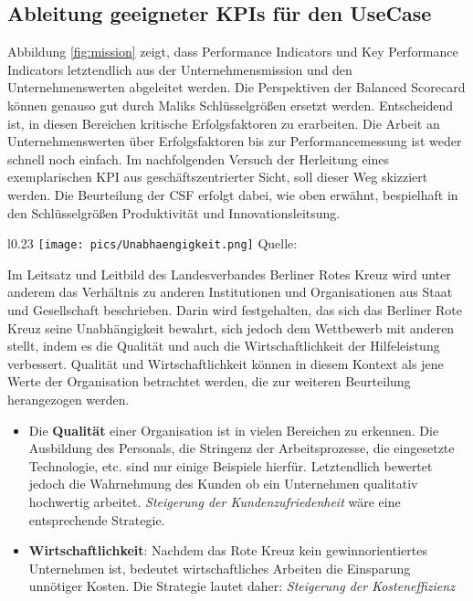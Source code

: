 \subsection{Ableitung geeigneter KPIs für den UseCase}
\label{drkkpi}
Abbildung \ref{fig:mission} zeigt, dass Performance Indicators und Key Performance Indicators letztendlich aus der Unternehmensmission und den Unternehmenswerten abgeleitet werden. Die Perspektiven der Balanced Scorecard können genauso gut durch Maliks Schlüsselgrößen ersetzt werden. Entscheidend ist, in diesen Bereichen kritische Erfolgsfaktoren zu erarbeiten. Die Arbeit an Unternehmenswerten über Erfolgsfaktoren bis zur Performancemessung ist weder schnell noch einfach. Im nachfolgenden Versuch der Herleitung eines exemplarischen KPI aus geschäftszentrierter Sicht, soll dieser Weg skizziert werden. Die Beurteilung der CSF erfolgt dabei, wie oben erwähnt, bespielhaft in den Schlüsselgrößen Produktivität und Innovationsleitsung.

\begin{wrapfigure}{l}{0.23\textwidth}
\label{values}
\centering
\texttt{[image: pics/Unabhaengigkeit.png]}
\tiny{Quelle: \citep{drk_rettungsdienst_2024}}
\end{wrapfigure}

Im Leitsatz und Leitbild des Landesverbandes Berliner Rotes Kreuz \citep{drk_rettungsdienst_2024} wird unter anderem das Verhältnis zu anderen Institutionen und Organisationen aus Staat und Gesellschaft beschrieben. Darin wird festgehalten, das sich das Berliner Rote Kreuz seine Unabhängigkeit bewahrt, sich jedoch dem Wettbewerb mit anderen stellt, indem es die Qualität und auch die Wirtschaftlichkeit der Hilfeleistung verbessert. Qualität und Wirtschaftlichkeit können in diesem Kontext als jene Werte der Organisation betrachtet werden, die zur weiteren Beurteilung herangezogen werden.

\begin{itemize}
 \itemsep-8pt
 \item Die \textbf{Qualität} einer Organisation ist in vielen Bereichen zu erkennen. Die Ausbildung des Personals, die Stringenz der Arbeitsprozesse, die eingesetzte Technologie, etc. sind nur einige Beispiele hierfür. Letztendlich bewertet jedoch die Wahrnehmung des Kunden ob ein Unternehmen qualitativ hochwertig arbeitet. \textit{Steigerung der Kundenzufriedenheit} wäre eine entsprechende Strategie.
 \item \textbf{Wirtschaftlichkeit}: Nachdem das Rote Kreuz kein gewinnorientiertes Unternehmen ist, bedeutet wirtschaftliches Arbeiten die Einsparung unnötiger Kosten. Die Strategie lautet daher: \textit{Steigerung der Kosteneffizienz}
\end{itemize} 

